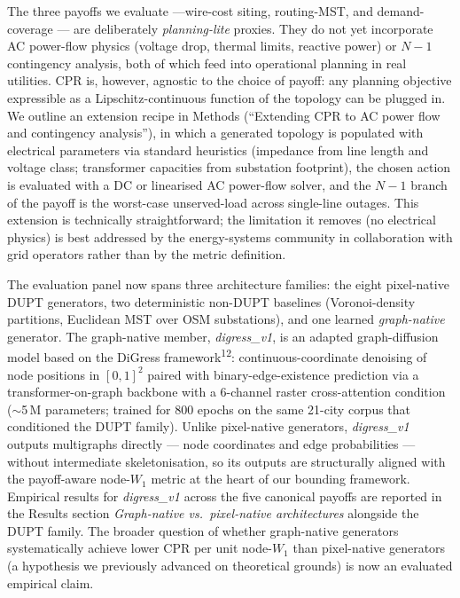 \documentclass[10pt,a4paper]{article}
\begin{document}
The three payoffs we evaluate ---wire-cost siting, routing-MST,
and demand-coverage --- are deliberately \emph{planning-lite}
proxies. They do not yet incorporate AC power-flow physics
(voltage drop, thermal limits, reactive power) or $N\!-\!1$
contingency analysis, both of which feed into operational planning
in real utilities. CPR is, however, agnostic to the choice of
payoff: any planning objective expressible as a Lipschitz-continuous
function of the topology can be plugged in. We outline an
extension recipe in Methods (``Extending CPR to AC power flow and
contingency analysis''), in which a generated topology is
populated with electrical parameters via standard heuristics
(impedance from line length and voltage class; transformer
capacities from substation footprint), the chosen action is
evaluated with a DC or linearised AC power-flow solver, and the
$N\!-\!1$ branch of the payoff is the worst-case unserved-load
across single-line outages. This extension is technically
straightforward; the limitation it removes (no electrical physics)
is best addressed by the energy-systems community in collaboration
with grid operators rather than by the metric definition.

The evaluation panel now spans three architecture families:
the eight pixel-native DUPT generators, two deterministic
non-DUPT baselines (Voronoi-density partitions, Euclidean MST
over OSM substations), and one learned \emph{graph-native}
generator. The graph-native member, \textit{digress\_v1}, is an
adapted graph-diffusion model based on the DiGress
framework\textsuperscript{12}: continuous-coordinate
denoising of node positions in $[0, 1]^2$ paired with
binary-edge-existence prediction via a transformer-on-graph
backbone with a 6-channel raster cross-attention condition
($\sim$5\,M parameters; trained for 800 epochs on the same
21-city corpus that conditioned the DUPT family). Unlike
pixel-native generators, \textit{digress\_v1} outputs
multigraphs directly --- node coordinates and edge probabilities
--- without intermediate skeletonisation, so its outputs are
structurally aligned with the payoff-aware node-$W_1$ metric
at the heart of our bounding framework.
Empirical results for \textit{digress\_v1} across the five
canonical payoffs are reported in the Results section
\textit{Graph-native vs.\ pixel-native architectures} alongside
the DUPT family. The
broader question of whether graph-native generators
systematically achieve lower CPR per unit node-$W_1$ than
pixel-native generators (a hypothesis we previously advanced
on theoretical grounds) is now an evaluated empirical claim.
\end{document}
